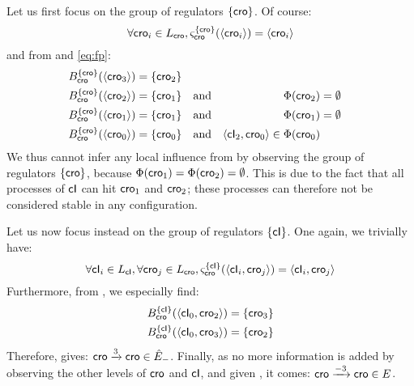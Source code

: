 Let us first focus on the group of regulators $\{ \mathsf{cro} \}$.
Of course:
\[\forall \mathsf{cro}_i \in L_{\mathsf{cro}}, \varsigma_{\mathsf{cro}}^{\{ \mathsf{cro} \}}(\langle \mathsf{cro}_i \rangle) = \langle \mathsf{cro}_i \rangle\]
and from  and \eqref{eq:fp}:
\begin{align*}
  B_{\mathsf{cro}}^{\{ \mathsf{cro} \}}(\langle \mathsf{cro}_3 \rangle) &= \{ \mathsf{cro}_2 \} && \\
  B_{\mathsf{cro}}^{\{ \mathsf{cro} \}}(\langle \mathsf{cro}_2 \rangle) &= \{ \mathsf{cro}_1 \} && \text{and} &
    \Phi&(\mathsf{cro}_2) = \emptyset \\
  B_{\mathsf{cro}}^{\{ \mathsf{cro} \}}(\langle \mathsf{cro}_1 \rangle) &= \{ \mathsf{cro}_1 \} && \text{and} &
    \Phi&(\mathsf{cro}_1) = \emptyset \\
  B_{\mathsf{cro}}^{\{ \mathsf{cro} \}}(\langle \mathsf{cro}_0 \rangle) &= \{ \mathsf{cro}_0 \} && \text{and} &
    \langle \mathsf{cI}_2, \mathsf{cro}_0 \rangle \in \Phi&(\mathsf{cro}_0)
\end{align*}
We thus cannot infer any local influence from 
by observing the group of regulators $\{ \mathsf{cro} \}$,
because $\Phi(\mathsf{cro}_1) = \Phi(\mathsf{cro}_2) = \emptyset$.
This is due to the fact that all processes of $\mathsf{cI}$ can hit $\mathsf{cro}_1$ and $\mathsf{cro}_2$;
these processes can therefore not be considered stable in any configuration.

Let us now focus instead on the group of regulators $\{ \mathsf{cI} \}$.
One again, we trivially have:
\[\forall \mathsf{cI}_i \in L_{\mathsf{cI}}, \forall \mathsf{cro}_j \in L_{\mathsf{cro}},
  \varsigma_{\mathsf{cro}}^{\{ \mathsf{cI} \}}(\langle \mathsf{cI}_i, \mathsf{cro}_j \rangle) = \langle \mathsf{cI}_i, \mathsf{cro}_j \rangle\]
Furthermore, from , we especially find:
\begin{align*}
  B_{\mathsf{cro}}^{\{ \mathsf{cI} \}}(\langle \mathsf{cI}_0, \mathsf{cro}_2 \rangle) &= \{ \mathsf{cro}_3 \} \\
  B_{\mathsf{cro}}^{\{ \mathsf{cI} \}}(\langle \mathsf{cI}_0, \mathsf{cro}_3 \rangle) &= \{ \mathsf{cro}_2 \}
\end{align*}
Therefore,  gives: $\mathsf{cro} \xrightarrow{3} \mathsf{cro} \in \hat{E}_-$.
Finally, as no more information is added by observing the other levels of $\mathsf{cro}$ and $\mathsf{cI}$,
and given , it comes: $\mathsf{cro} \xrightarrow{- 3} \mathsf{cro} \in E$.



